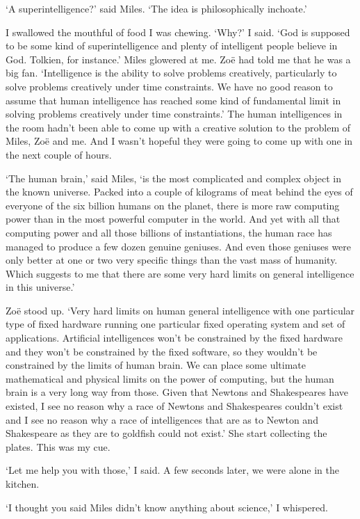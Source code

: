 `A superintelligence?' said Miles. `The idea is philosophically
inchoate.'

I swallowed the mouthful of food I was chewing. `Why?' I said. `God
is supposed to be some kind of superintelligence and plenty of
intelligent people believe in God. Tolkien, for instance.' Miles
glowered at me. Zo{\"e} had told me that he was a big fan.
`Intelligence is the ability to solve problems creatively,
particularly to solve problems creatively under time constraints. We
have no good reason to assume that human intelligence has reached
some kind of fundamental limit in solving problems creatively under
time constraints.' The human intelligences in the room hadn't been
able to come up with a creative solution to the problem of Miles,
Zo{\"e} and me. And I wasn't hopeful they were going to come up with
one in the next couple of hours.

`The human brain,' said Miles, `is the most complicated and complex
object in the known universe. Packed into a couple of kilograms of
meat behind the eyes of everyone of the six billion humans on the
planet, there is more raw computing power than in the most powerful
computer in the world. And yet with all that computing power and all
those billions of instantiations, the human race has managed to
produce a few dozen genuine geniuses. And even those geniuses were
only better at one or two very specific things than the vast mass of
humanity. Which suggests to me that there {\twelveit are\/} some
very hard limits on general intelligence in this universe.'

Zo{\"e} stood up. `Very hard limits on {\twelveit human\/} general
intelligence with one particular type of fixed hardware running one
particular fixed operating system and set of applications.
Artificial intelligences won't be constrained by the fixed hardware
and they won't be constrained by the fixed software, so they
wouldn't be constrained by the limits of human brain. We can place
some ultimate mathematical and physical limits on the power of
computing, but the human brain is a very long way from those. Given
that Newtons and Shakespeares have existed, I see no reason why a
race of Newtons and Shakespeares couldn't exist and I see no reason
why a race of intelligences that are as to Newton and Shakespeare as
they are to goldfish could not exist.' She start collecting the
plates. This was my cue.

`Let me help you with those,' I said. A few seconds later, we were
alone in the kitchen.

`I thought you said Miles didn't know anything about science,' I
whispered.


